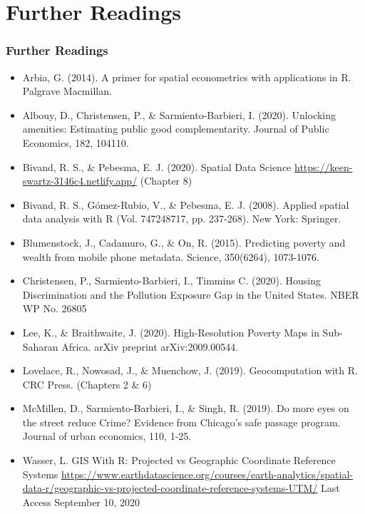 \documentclass[
  shownotes,
  xcolor={svgnames},
  hyperref={colorlinks,citecolor=DarkBlue,linkcolor=DarkRed,urlcolor=DarkBlue}
  ]{beamer}
\begin{document}
\section{Further Readings}
\begin{frame}
\frametitle{Further Readings}
\scriptsize
\begin{itemize}

   
  \item Arbia, G. (2014). A primer for spatial econometrics with applications in R. Palgrave Macmillan.
  \medskip
  \item Albouy, D., Christensen, P., \& Sarmiento-Barbieri, I. (2020). Unlocking amenities: Estimating public good complementarity. Journal of Public Economics, 182, 104110.
  \medskip
  \item Bivand, R. S.,  \& Pebesma, E. J. (2020). Spatial Data Science \url{https://keen-swartz-3146c4.netlify.app/} (Chapter 8)
  \medskip
  \item Bivand, R. S., Gómez-Rubio, V., \& Pebesma, E. J. (2008). Applied spatial data analysis with R (Vol. 747248717, pp. 237-268). New York: Springer.
  \medskip
  \item Blumenstock, J., Cadamuro, G., \& On, R. (2015). Predicting poverty and wealth from mobile phone metadata. Science, 350(6264), 1073-1076.
  \medskip
  \item Christensen, P.,  Sarmiento-Barbieri, I., Timmins C. (2020). Housing Discrimination and the Pollution Exposure Gap in the United States. NBER WP No. 26805
  \medskip
  \item Lee, K., \& Braithwaite, J. (2020). High-Resolution Poverty Maps in Sub-Saharan Africa. arXiv preprint arXiv:2009.00544.
  \medskip
  \item Lovelace, R., Nowosad, J., \& Muenchow, J. (2019). Geocomputation with R. CRC Press. (Chapters 2 \& 6)
  \medskip
  \item McMillen, D., Sarmiento-Barbieri, I., \& Singh, R. (2019). Do more eyes on the street reduce Crime? Evidence from Chicago's safe passage program. Journal of urban economics, 110, 1-25.
  \medskip
  \item Wasser, L. GIS With R: Projected vs Geographic Coordinate Reference Systems \url{https://www.earthdatascience.org/courses/earth-analytics/spatial-data-r/geographic-vs-projected-coordinate-reference-systems-UTM/} Last Access September 10, 2020
\end{itemize}

\end{frame}






\end{document}

